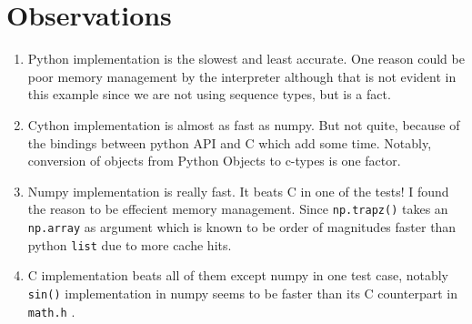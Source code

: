 \documentclass{article}
\begin{document}
\FloatBarrier
\section{Observations}
\begin{enumerate}
	\item Python implementation is the slowest and least accurate. One reason could be poor memory management by the interpreter although that is not evident in this example since we are not using sequence types, but is a fact.
	\item Cython implementation is almost as fast as numpy. But not quite, because of the bindings between python API and C which add some time. Notably, conversion of objects from Python Objects to c-types is one factor.
	\item Numpy implementation is really fast. It beats C in one of the tests! I found the reason to be effecient memory management. Since \texttt{np.trapz()} takes an \texttt{np.array} as argument which is known to be order of magnitudes faster than python \texttt{list} due to more cache hits.
	\item C implementation beats all of them except numpy in one test case, notably \texttt{sin()} implementation in numpy seems to be faster than its C counterpart in \texttt{math.h} .
\end{enumerate}
\end{document}

